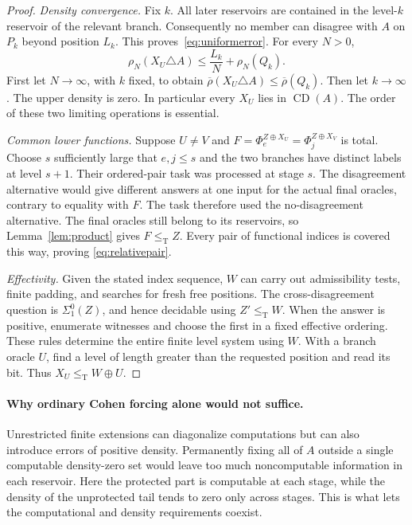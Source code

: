 \documentclass[11pt,a4paper]{article}
\newcommand{\leT}{\leq_{\mathrm T}}
\newcommand{\CD}{\operatorname{CD}}
\newcommand{\udens}{\overline\rho}
\theoremstyle{definition}
\theoremstyle{remark}
\begin{document}
\begin{proof}
\emph{Density convergence.} Fix $k$. All later reservoirs are contained
in the level-$k$ reservoir of the relevant branch. Consequently no member
can disagree with $A$ on $P_k$ beyond position $L_k$.
This proves~\eqref{eq:uniformerror}. For every $N>0$,
\begin{equation}\label{eq:densitybudget}
 \rho_N(X_U\triangle A)\le \frac{L_k}{N}+\rho_N(Q_k).
\end{equation}
First let $N\to\infty$, with $k$ fixed, to obtain
$\udens(X_U\triangle A)\le\udens(Q_k)$. Then let $k\to\infty$.
The upper density is zero. In particular every $X_U$ lies in $\CD(A)$.
The order of these two limiting operations is essential.

\emph{Common lower functions.} Suppose $U\ne V$ and
$F=\Phi_e^{Z\oplus X_U}=\Phi_j^{Z\oplus X_V}$ is total.
Choose $s$ sufficiently large that $e,j\le s$ and the two branches have
distinct labels at level $s+1$. Their ordered-pair task was processed at
stage $s$. The disagreement alternative would give different answers at
one input for the actual final oracles, contrary to equality with $F$.
The task therefore used the no-disagreement alternative. The final oracles
still belong to its reservoirs, so Lemma~\ref{lem:product} gives $F\leT Z$.
Every pair of functional indices is covered this way, proving
\eqref{eq:relativepair}.

\emph{Effectivity.} Given the stated index sequence, $W$ can carry out
admissibility tests, finite padding, and searches for fresh free positions.
The cross-disagreement question is $\Sigma^0_1(Z)$, and hence decidable
using $Z'\leT W$. When the answer is positive, enumerate witnesses and
choose the first in a fixed effective ordering. These rules determine
the entire finite level system using $W$. With a branch oracle $U$, find
a level of length greater than the requested position and read its bit.
Thus $X_U\leT W\oplus U$.
\end{proof}

\paragraph{Why ordinary Cohen forcing alone would not suffice.}
Unrestricted finite extensions can diagonalize computations but can also
introduce errors of positive density. Permanently fixing all of $A$ outside
a single computable density-zero set would leave too much noncomputable
information in each reservoir. Here the protected part is computable at
each stage, while the density of the unprotected tail tends to zero only
across stages. This is what lets the computational and density requirements
coexist.
\end{document}
